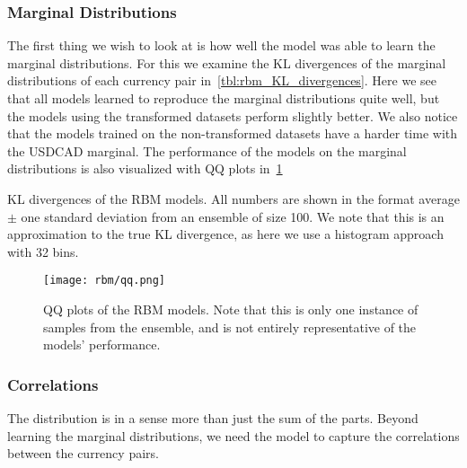 \subsubsection{Marginal Distributions}
The first thing we wish to look at is how well the model was able to learn the marginal distributions.
For this we examine the KL divergences of the marginal distributions of each currency pair in~\cref{tbl:rbm_KL_divergences}.
Here we see that all models learned to reproduce the marginal distributions quite well, but the models using the transformed datasets perform slightly better.
We also notice that the models trained on the non-transformed datasets have a harder time with the USDCAD marginal.
The performance of the models on the marginal distributions is also visualized with QQ plots in~\cref{fig:rbm_qq_plots}
\begin{table}[!htb]
    \centering
    \begin{adjustbox}{max width=\textwidth}
        
    \end{adjustbox}
    \caption{KL divergences of the RBM models. All numbers are shown in the format average \(\pm\) one standard deviation from an ensemble of size 100. We note that this is an approximation to the true KL divergence, as here we use a histogram approach with 32 bins.}
    \label{tbl:rbm_KL_divergences}
\end{table}
\begin{figure}[!htb]
    \begin{center}
        \texttt{[image: rbm/qq.png]}
    \end{center}
    \caption{QQ plots of the RBM models. Note that this is only one instance of samples from the ensemble, and is not entirely representative of the models' performance.}
    \label{fig:rbm_qq_plots}
\end{figure}

\subsubsection{Correlations}
The distribution is in a sense more than just the sum of the parts.
Beyond learning the marginal distributions, we need the model to capture the correlations between the currency pairs.

